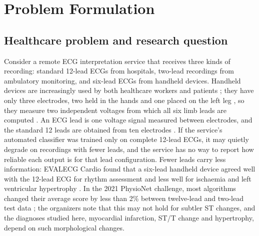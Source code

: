 
\section{Problem Formulation}

\subsection{Healthcare problem and research question}

Consider a remote ECG interpretation service that receives three kinds of recording: standard 12-lead ECGs from hospitals, two-lead recordings from ambulatory monitoring, and six-lead ECGs from handheld devices. Handheld devices are increasingly used by both healthcare workers and patients \citep{azram2021evalecg}; they have only three electrodes, two held in the hands and one placed on the left leg \citep{azram2021evalecg}, so they measure two independent voltages from which all six limb leads are computed \citep{reyna2022issues}. An ECG lead is one voltage signal measured between electrodes, and the standard 12 leads are obtained from ten electrodes \citep{presacan2025reconstruction}. If the service's automated classifier was trained only on complete 12-lead ECGs, it may quietly degrade on recordings with fewer leads, and the service has no way to report how reliable each output is for that lead configuration. Fewer leads carry less information: EVALECG Cardio found that a six-lead handheld device agreed well with the 12-lead ECG for rhythm assessment and less well for ischaemia and left ventricular hypertrophy \citep{azram2021evalecg}. In the 2021 PhysioNet challenge, most algorithms changed their average score by less than 2\% between twelve-lead and two-lead test data \citep{reyna2022issues}; the organizers note that this may not hold for subtler ST changes, and the diagnoses studied here, myocardial infarction, ST/T change and hypertrophy, depend on such morphological changes.

